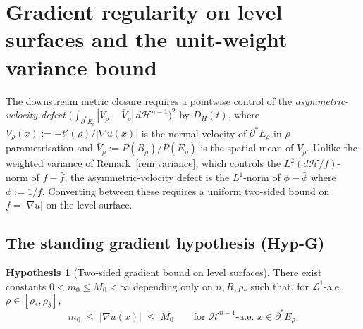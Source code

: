 \documentclass[11pt]{article}
\theoremstyle{definition}
\newtheorem{hypothesis}[theorem]{Hypothesis}
\newcommand{\rstar}{\rho_{*}}
\begin{document}
\section{Gradient regularity on level surfaces and the
unit-weight variance bound}\label{sec:gradient}

The downstream metric closure \cite{WeightedMetricTrace} requires a
pointwise control of the \emph{asymmetric-velocity defect}
$\bigl(\int_{\partial^{*}E_{t}}|V_{\rho}-\bar V_{\rho}|\,d\mathcal H^{n-1}\bigr)^{2}$
by $D_{H}(t)$, where $V_{\rho}(x):=-t'(\rho)/|\nabla u(x)|$ is the
normal velocity of $\partial^{*}E_{\rho}$ in $\rho$-parametrisation and
$\bar V_{\rho}:=P(B_{\rho})/P(E_{\rho})$ is the spatial mean of $V_{\rho}$.
Unlike the weighted variance of Remark~\ref{rem:variance}, which controls
the $L^{2}(d\mathcal H/f)$-norm of $f-\bar f$, the asymmetric-velocity
defect is the $L^{1}$-norm of $\phi-\bar\phi$ where $\phi:=1/f$.
Converting between these requires a uniform two-sided bound on
$f=|\nabla u|$ on the level surface.

\subsection{The standing gradient hypothesis (Hyp-G)}\label{ssec:hypG}

\begin{hypothesis}[Two-sided gradient bound on level surfaces]
\label{hyp:G}
There exist constants $0<m_{0}\le M_{0}<\infty$ depending only on
$n,R,\rstar$ such that, for $\mathcal L^{1}$-a.e.\
$\rho\in[\rstar,\rho_{\delta}]$,
\[
   m_{0}\;\le\;|\nabla u(x)|\;\le\;M_{0}
   \qquad\text{for }\mathcal H^{n-1}\text{-a.e.\ }
   x\in\partial^{*}E_{\rho}.
\]
\end{hypothesis}
\end{document}
